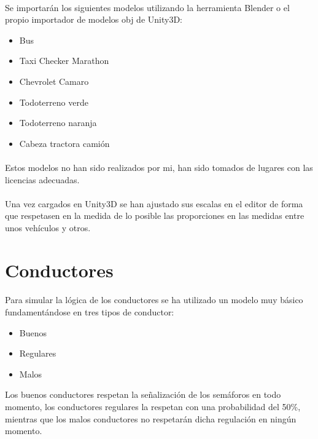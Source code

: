 	\paragraph{}
	Se importarán los siguientes modelos utilizando la herramienta Blender \cite{Blender_web} o el propio importador de modelos obj de Unity3D:
	\begin{itemize}
		\item Bus
		\item Taxi Checker Marathon
		\item Chevrolet Camaro
		\item Todoterreno verde
		\item Todoterreno naranja
		\item Cabeza tractora camión
	\end{itemize}
	
	\paragraph{}	
	Estos modelos no han sido realizados por mi, han sido tomados de lugares con las licencias adecuadas.
	
	\paragraph{}
	Una vez cargados en Unity3D se han ajustado sus escalas en el editor de forma que respetasen en la medida de lo posible las proporciones en las medidas entre unos vehículos y otros.
	
\section{Conductores}

	\paragraph{}
	Para simular la lógica de los conductores se ha utilizado un modelo muy básico fundamentándose en tres tipos de conductor:
	
	\begin{itemize}
	\item Buenos
	\item Regulares
	\item Malos
	\end{itemize}
	
	Los buenos conductores respetan la señalización de los semáforos en todo momento, los conductores regulares la respetan con una probabilidad del 50\%, mientras que los malos conductores no respetarán dicha regulación en ningún momento.
	
